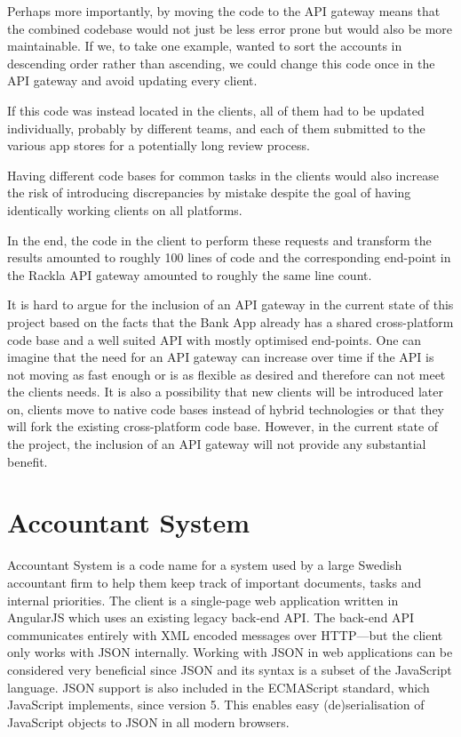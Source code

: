 \documentclass{cslthse-msc}
\begin{document}
Perhaps more importantly, by moving the code to the API gateway means that the combined codebase would not just be less error prone but would also be more maintainable. If we, to take one example, wanted to sort the accounts in descending order rather than ascending, we could change this code once in the API gateway and avoid updating every client. 

If this code was instead located in the clients, all of them had to be updated individually, probably by different teams, and each of them submitted to the various app stores for a potentially long review process.

Having different code bases for common tasks in the clients would also increase the risk of introducing discrepancies by mistake despite the goal of having identically working clients on all platforms.

In the end, the code in the client to perform these requests and transform the results amounted to roughly 100 lines of code and the corresponding end-point in the Rackla API gateway amounted to roughly the same line count.

It is hard to argue for the inclusion of an API gateway in the current state of this project based on the facts that the Bank App already has a shared cross-platform code base and a well suited API with mostly optimised end-points. One can imagine that the need for an API gateway can increase over time if the API is not moving as fast enough or is as flexible as desired and therefore can not meet the clients needs. It is also a possibility that new clients will be introduced later on, clients move to native code bases instead of hybrid technologies or that they will fork the existing cross-platform code base. However, in the current state of the project, the inclusion of an API gateway will not provide any substantial benefit.

\section{Accountant System}

Accountant System is a code name for a system used by a large Swedish accountant firm to help them keep track of important documents, tasks and internal priorities. The client is a single-page web application written in AngularJS which uses an existing legacy back-end API. The back-end API communicates entirely with XML encoded messages over HTTP---but the client only works with JSON internally. Working with JSON in web applications can be considered very beneficial since JSON and its syntax is a subset of the JavaScript language. JSON support is also included in the ECMAScript standard, which JavaScript implements, since version 5\cite{ecmascript_5}. This enables easy (de)serialisation of JavaScript objects to JSON in all modern browsers.
\end{document}
